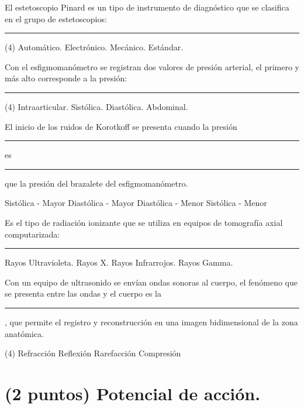 \documentclass[12pt, letter]{exam}
\begin{document}
\begin{questions}
    \question El estetoscopio Pinard es un tipo de instrumento de diagnóstico que se clasifica en el grupo de estetoscopios: \rule{2cm}{0.1mm}
    \begin{tasks}(4)
        \task Automático.
        \task Electrónico.
        \task Mecánico.
        \task Estándar.
    \end{tasks}
    \question Con el esfigmomanómetro se registran dos valores de presión arterial, el primero y más alto corresponde a la presión: \rule{2cm}{0.1mm}
    \begin{tasks}(4)
        \task Intraarticular.
        \task Sistólica.
        \task Diastólica.
        \task Abdominal.
    \end{tasks}
    \question El inicio de los ruidos de Korotkoff se presenta cuando la presión \rule{2cm}{0.1mm} es \rule{2cm}{0.1mm} que la presión del brazalete del esfigmomanómetro.
    \begin{multicols}{2}
    \begin{tasks}
        \task Sistólica - Mayor
        \task Diastólica - Mayor
        \task Diastólica - Menor
        \task Sistólica - Menor
    \end{tasks}
    \end{multicols}
    \question Es el tipo de radiación ionizante que se utiliza en equipos de tomografía axial computarizada: \rule{2cm}{0.1mm}
    \begin{multicols}{2}
    \begin{tasks}
        \task Rayos Ultravioleta.
        \task Rayos X.
        \task Rayos Infrarrojos.
        \task Rayos Gamma.
    \end{tasks}
    \end{multicols}
    \question Con un equipo de ultrasonido se envían ondas sonoras al cuerpo, el fenómeno que se presenta entre las ondas y el cuerpo es la \rule{2cm}{0.1mm}, que permite el registro y reconstrucción en una imagen bidimensional de la zona anatómica.
    \begin{tasks}(4)
        \task Refracción
        \task Reflexión
        \task Rarefacción
        \task Compresión
    \end{tasks}

    \section{(2 puntos) Potencial de acción.}


\end{questions}
\end{document}

